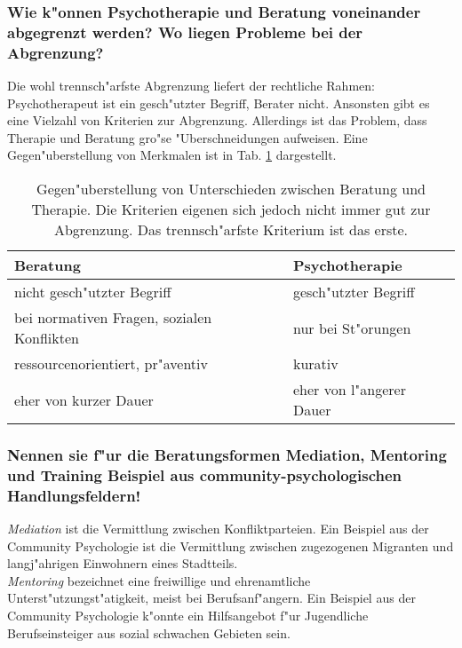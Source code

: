 \subsubsection{Wie k"onnen Psychotherapie und Beratung voneinander abgegrenzt werden? Wo liegen Probleme bei der Abgrenzung?}
Die wohl trennsch"arfste Abgrenzung liefert der rechtliche Rahmen: Psychotherapeut ist ein gesch"utzter Begriff, Berater nicht. Ansonsten gibt es eine Vielzahl von Kriterien zur Abgrenzung. Allerdings ist das Problem, dass Therapie und Beratung gro"se "Uberschneidungen aufweisen. Eine Gegen"uberstellung von Merkmalen ist in Tab. \ref{tab:beratung} dargestellt.
\begin{table}[h!]
        \centering
        \begin{tabular}{p{7cm} p{7cm}}
                \hline
                Beratung & Psychotherapie\\
                \hline
                nicht gesch"utzter Begriff & gesch"utzter Begriff\\
                bei normativen Fragen, sozialen Konflikten & nur bei St"orungen\\
                ressourcenorientiert, pr"aventiv & kurativ\\
                eher von kurzer Dauer & eher von l"angerer Dauer\\
                \hline
        \end{tabular}
        \caption{Gegen"uberstellung von Unterschieden zwischen Beratung und Therapie. Die Kriterien eigenen sich jedoch nicht immer gut zur Abgrenzung. Das trennsch"arfste Kriterium ist das erste.}
        \label{tab:beratung}
\end{table}

\subsubsection{Nennen sie f"ur die Beratungsformen Mediation, Mentoring und Training Beispiel aus community-psychologischen Handlungsfeldern!}
\emph{Mediation} ist die Vermittlung zwischen Konfliktparteien. Ein Beispiel aus der Community Psychologie ist die Vermittlung zwischen zugezogenen Migranten und langj"ahrigen Einwohnern eines Stadtteils.\\

\noindent \emph{Mentoring} bezeichnet eine freiwillige und ehrenamtliche Unterst"utzungst"atigkeit, meist bei Berufsanf"angern. Ein Beispiel aus der Community Psychologie k"onnte ein Hilfsangebot f"ur Jugendliche Berufseinsteiger aus sozial schwachen Gebieten sein.\\

